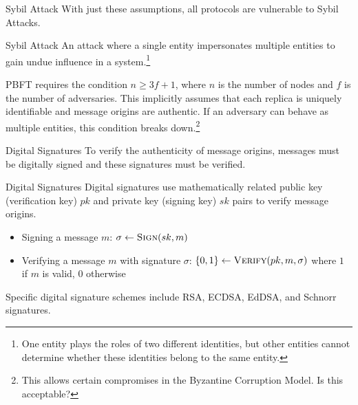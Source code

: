 \documentclass[aspectratio=169,10pt]{beamer}
\newenvironment{proofblock}[1][]
{\begin{block}{#1}\vspace{0.5em}}
{\vspace{0.5em}\end{block}}
\newenvironment{outlineblock}[1][]
{\begin{tcolorbox}[colframe=black, colback=white, boxrule=1pt, boxsep=5pt]}
{\end{tcolorbox}}
\begin{document}
\begin{frame}{Sybil Attack}
With just these assumptions, all protocols are vulnerable to Sybil Attacks.

\begin{proofblock}[Sybil Attack]
An attack where a single entity impersonates multiple entities to gain undue influence in a system.\footnote{One entity plays the roles of two different identities, but other entities cannot determine whether these identities belong to the same entity.}
\end{proofblock}

\begin{outlineblock}[Conditions for Sybil Attack]
    PBFT requires the condition $n \geq 3f+1$, where $n$ is the number of nodes and $f$ is the number of adversaries.
    This implicitly assumes that each replica is uniquely identifiable and message origins are authentic.
    If an adversary can behave as multiple entities, this condition breaks down.\footnote{This allows certain compromises in the Byzantine Corruption Model. Is this acceptable?}
\end{outlineblock}
\end{frame}

\begin{frame}{Digital Signatures}
To verify the authenticity of message origins, messages must be digitally signed and these signatures must be verified.

\begin{proofblock}[Digital Signatures]
    Digital signatures use mathematically related public key (verification key) $pk$ and private key (signing key) $sk$ pairs to verify message origins.
    \begin{itemize}
        \item Signing a message $m$: $\sigma \gets \textsc{Sign}(sk, m)$
        \item Verifying a message $m$ with signature $\sigma$: $\{0, 1\} \gets \textsc{Verify}(pk, m, \sigma)$ where $1$ if $m$ is valid, $0$ otherwise
    \end{itemize}
\end{proofblock}
Specific digital signature schemes include RSA, ECDSA, EdDSA, and Schnorr signatures.
\end{frame}
\end{document}
